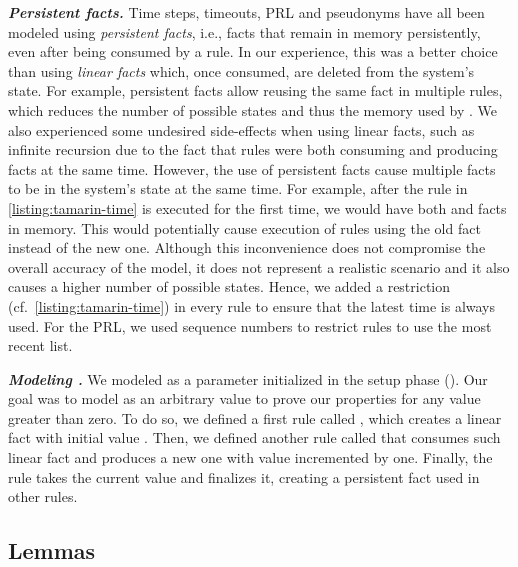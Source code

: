 \noindent\textbf{\emph{Persistent facts.}}
%
Time steps, timeouts, \ac{PRL} and pseudonyms have all been modeled using
\emph{persistent facts}, i.e., facts that remain in memory persistently, even
after being consumed by a rule. In our experience, this was a better choice than
using \emph{linear facts} which, once consumed, are deleted from the system's
state. For example, persistent facts allow reusing the same 
fact in multiple rules, which reduces the number of possible states and thus the
memory used by \tamarin. We also experienced some undesired side-effects when
using linear facts, such as infinite recursion due to the fact that rules were
both consuming and producing  facts at the same time. However,
the use of persistent facts cause multiple  facts to be in the
system's state at the same time. For example, after the rule
 in \cref{listing:tamarin-time} is executed for the first
time, we would have both  and  facts
in memory. This would potentially cause execution of rules using the old
 fact instead of the new one. Although this inconvenience does
not compromise the overall accuracy of the model, it does not represent a
realistic scenario and it also causes a higher number of possible states. Hence,
we added a restriction 
(cf.~\cref{listing:tamarin-time}) in every rule to ensure that the latest time
is always used. For the \ac{PRL}, we used sequence numbers to restrict rules to
use the most recent list.

\noindent\textbf{\emph{Modeling \paramtt{}.}}
%
We modeled \paramtt{} as a parameter initialized in the setup phase
(). Our goal was to model \paramtt{} as an arbitrary value to
prove our properties for any value greater than zero. To do so, we defined a
first rule called , which creates a linear fact
 with initial value . Then, we defined another rule
called  that consumes such linear fact and produces a new
one with value incremented by one. Finally, the  rule takes the
current value and finalizes it, creating a persistent fact 
used in other rules.

\subsection{Lemmas}
\label{section:tamarin-lemmas}


